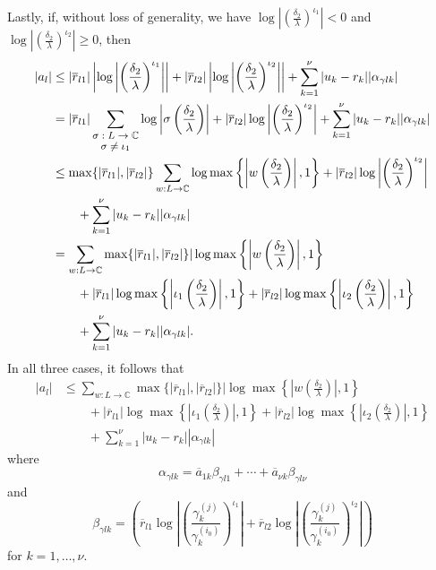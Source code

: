 Lastly, if, without loss of generality, we have $\log\left|\left(\frac{\delta_2}{\lambda}\right)^{\iota_1}\right| < 0$ and $\log\left|\left(\frac{\delta_2}{\lambda}\right)^{\iota_2}\right| \geq 0$, then
\begin{align*}
|a_l| 	& \leq |\overline{r}_{l1}|\left|\log\left|\left(\frac{\delta_2}{\lambda}\right)^{\iota_1}\right|\right| + |\overline{r}_{l2}|\left|\log\left|\left(\frac{\delta_2}{\lambda}\right)^{\iota_2}\right|\right| + \sum_{k=1}^{\nu}|u_k-r_k||\alpha_{\gamma l k}|\\
	& = |\overline{r}_{l1}|\sum_{\shortstack{\footnotesize $\sigma: L \to \mathbb{C} $\\ \footnotesize $ \sigma \neq \iota_1$}} \log\left|\sigma \left(\frac{\delta_2}{\lambda}\right)\right|+ |\overline{r}_{l2}|\log\left|\left(\frac{\delta_2}{\lambda}\right)^{\iota_2}\right| + \sum_{k=1}^{\nu}|u_k-r_k||\alpha_{\gamma l k}|\\
	& \leq \max\{|\overline{r}_{l1}|, |\overline{r}_{l2}|\}\sum_{w: L \to \mathbb{C}} \log \max \left\{\left|w\left(\frac{\delta_2}{\lambda}\right)\right|, 1\right\} +  |\overline{r}_{l2}|\log\left|\left(\frac{\delta_2}{\lambda}\right)^{\iota_2}\right| \\
	&\quad \quad +\sum_{k=1}^{\nu}|u_k-r_k||\alpha_{\gamma l k}| \\
	& = \sum_{w: L \to \mathbb{C}}\max\{|\overline{r}_{l1}|, |\overline{r}_{l2}|\}|\log\max\left\{\left|w\left(\frac{\delta_2}{\lambda}\right)\right|,1\right\}  \\
	& \quad\quad + |\overline{r}_{l1}|\log\max\left\{\left|\iota_1\left(\frac{\delta_2}{\lambda}\right)\right|,1\right\}+ |\overline{r}_{l2}|\log\max\left\{\left|\iota_2\left(\frac{\delta_2}{\lambda}\right)\right|,1\right\}\\
	&\quad\quad + \sum_{k=1}^{\nu}|u_k-r_k||\alpha_{\gamma l k}|.
\end{align*}
In all three cases, it follows that
\begin{align*}
|a_l|	& \leq \sum_{w: L \to \mathbb{C}}\max\{|\overline{r}_{l1}|, |\overline{r}_{l2}|\}|\log\max\left\{\left|w\left(\frac{\delta_2}{\lambda}\right)\right|,1\right\} \\
	&\quad\quad + |\overline{r}_{l1}|\log\max\left\{\left|\iota_1\left(\frac{\delta_2}{\lambda}\right)\right|,1\right\} + |\overline{r}_{l2}|\log\max\left\{\left|\iota_2\left(\frac{\delta_2}{\lambda}\right)\right|,1\right\}\\
	&\quad\quad+ \sum_{k=1}^{\nu}|u_k-r_k||\alpha_{\gamma l k}|
\end{align*}
where
\[\alpha_{\gamma l k} = \overline{a}_{1k}\beta_{\gamma l 1} + \cdots + \overline{a}_{\nu k}\beta_{\gamma l \nu}\]
and
\[\beta_{\gamma l k} = \left(\overline{r}_{l1} \log\left| \left( \frac{\gamma_k^{(j)}}{\gamma_k^{(i_0)}}\right)^{\iota_1}\right|+ \overline{r}_{l2}\log\left| \left( \frac{\gamma_k^{(j)}}{\gamma_k^{(i_0)}}\right)^{\iota_2}\right|\right)\]
for $k = 1, \dots, \nu$.

